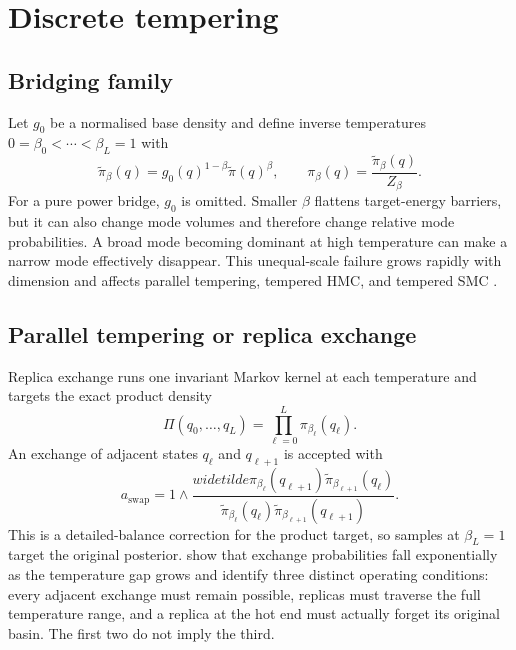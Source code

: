 \documentclass[11pt]{article}
\begin{document}
\section{Discrete tempering}

\subsection{Bridging family}

Let $g_0$ be a normalised base density and define inverse temperatures
$0=\beta_0<\cdots<\beta_L=1$ with
\begin{equation}
  \widetilde\pi_\beta(q)
  =g_0(q)^{1-\beta}\widetilde\pi(q)^\beta,
  \qquad
  \pi_\beta(q)=\frac{\widetilde\pi_\beta(q)}{Z_\beta}.
  \label{eq:bridge}
\end{equation}
For a pure power bridge, $g_0$ is omitted.  Smaller $\beta$ flattens target-energy
barriers, but it can also change mode volumes and therefore change relative mode
probabilities.  A broad mode becoming dominant at high temperature can make a
narrow mode effectively disappear.  This unequal-scale failure grows rapidly with
dimension and affects parallel tempering, tempered HMC, and tempered SMC
\citep{park2025athmc}.

\subsection{Parallel tempering or replica exchange}

Replica exchange runs one invariant Markov kernel at each temperature and targets
the exact product density
\begin{equation}
  \Pi(q_0,\ldots,q_L)=\prod_{\ell=0}^{L}\pi_{\beta_\ell}(q_\ell).
\end{equation}
An exchange of adjacent states $q_\ell$ and $q_{\ell+1}$ is accepted with
\begin{equation}
  a_{\mathrm{swap}}=1\wedge
  \frac{widetilde\pi_{\beta_\ell}(q_{\ell+1})
        \widetilde\pi_{\beta_{\ell+1}}(q_\ell)}
       {\widetilde\pi_{\beta_\ell}(q_\ell)
        \widetilde\pi_{\beta_{\ell+1}}(q_{\ell+1})}.
  \label{eq:swap}
\end{equation}
This is a detailed-balance correction for the product target, so samples at
$\beta_L=1$ target the original posterior.  \citet{hukushima1996exchange} show that
exchange probabilities fall exponentially as the temperature gap grows and identify
three distinct operating conditions: every adjacent exchange must remain possible,
replicas must traverse the full temperature range, and a replica at the hot end must
actually forget its original basin.  The first two do not imply the third.
\end{document}

